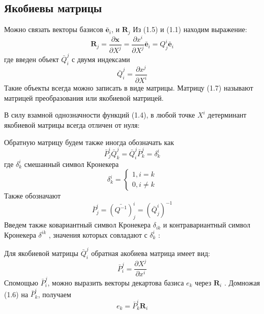 \subsection {Якобиевы матрицы}
Можно связать векторы базисов $\bar{\textbf{e}}_i$, и $\textbf{R}_j$  Из (1.5) и (1.1) находим выражение:
\begin{equation}
    \textbf{R}_j = \frac{\partial\textbf{x}}{\partial X^j} = \frac{\partial x^i}{\partial X^j} \bar{\textbf{e}}_i = Q^i_j \bar{\textbf{e}}_i
\end{equation}
где введен объект $\bar{Q}^j_i$ с двумя индексами
\begin{equation}
    \bar{Q}^j_i= \frac{\partial x^j}{\partial X^i}
\end{equation}
Такие объекты всегда можно записать в виде матрицы. Матрицу (1.7) называют матрицей преобразования или якобиевой матрицей.\par

В силу взамной однозначности функций (1.4), в любой точке $X^i$ детерминант якобиевой матрицы всегда отличен от нуля:

Обратную матрицу будем также иногда обозначать как 
\begin{equation}
    \bar{P}^i_j\bar{Q}^j_k = \bar{Q}^j_i\bar{P}^j_k  = \delta^i_k
\end{equation}
где $\delta^i_k$ смешанный символ Кронекера
\begin{equation}
    \delta^i_k = \begin{cases}
    1, i = k\\
    0, i \ne k
    \end{cases}
\end{equation}
Также обозначают
\begin{equation}
    \bar{P}^i_j= (\bar{Q^{-1}})^i_j   = (\bar{Q}^i_j)^{-1} 
\end{equation}
Введем также ковариантный символ Кронекера $\delta_{ik}$  и контравариантный символ Кронекера $\delta^{ik}$ , значения которых совладают с $\delta^i_k$ :

Для якобиевой матрицы $\bar{Q}^j_i$ обратная акобиева матрица имеет вид:
\begin{equation}
    \bar{P}^j_i= \frac{\partial X^j}{\partial x^i}
\end{equation}
Спомощью $\bar{P}^j_i$, можно выразить векторы декартова базиса $e_k$ через $\textbf{R}_i$ . Домножая (1.6) на $\bar{P}^i_k$, получаем
\begin{equation}
    e_k = \bar{P}^i_k \textbf{R}_i
\end{equation}
